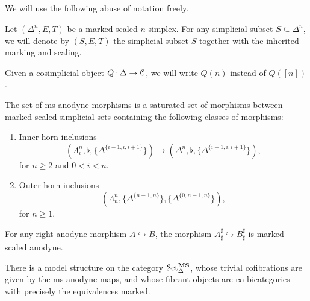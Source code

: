 \documentclass[main.tex]{subfiles}
\begin{document}
We will use the following abuse of notation freely.

\begin{notation}
  Let $(\Delta^{n}, E, T)$ be a marked-scaled $n$-simplex. For any simplicial subset $S \subseteq \Delta^{n}$, we will denote by $(S, E, T)$ the simplicial subset $S$ together with the inherited marking and scaling.
\end{notation}

\begin{notation}
  Given a cosimplicial object $Q\colon \Delta \to \mathcal{C}$, we will write $Q(n)$ instead of $Q([n])$.
\end{notation}

\begin{definition}
  \label{def:ms-anodyne_morphisms}
  The set of ms-anodyne morphisms is a saturated set of morphisms between marked-scaled simplicial sets containing the following classes of morphisms:
  \begin{enumerate}[label=(A\arabic*)]
    \item\label{item:innerms} Inner horn inclusions
      \begin{equation*}
        (\Lambda^{n}_{i}, \flat, \{\Delta^{\{i-1,i,i+1\}}\}) \to (\Delta^{n}, \flat, \{\Delta^{\{i-1,i,i+1\}}\}),
      \end{equation*}
      for $n \geq 2$ and $0 < i < n$.

    \item\label{item:outerms} Outer horn inclusions
      \begin{equation*}
        (\Lambda^{n}_{n}, \{\Delta^{\{n-1,n\}}\}, \{\Delta^{\{0, n-1, n\}}\}),
      \end{equation*}
      for $n \geq 1$.
  \end{enumerate}
\end{definition}

\begin{proposition}
  \label{prop:sharp_marked_right_anodyne}
  For any right anodyne morphism $A \hookrightarrow B$, the morphism $A^{\sharp}_{\sharp} \hookrightarrow B^{\sharp}_{\sharp}$ is marked-scaled anodyne.
\end{proposition}

\begin{theorem}
  There is a model structure on the category $\mathcal{S}\mathrm{et}_{\Delta}^{\mathbf{MS}}$, whose trivial cofibrations are given by the ms-anodyne maps, and whose fibrant objects are $\infty$-bicategories with precisely the equivalences marked.
\end{theorem}
\end{document}
